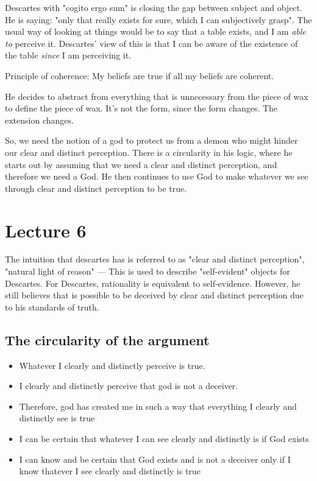 \documentclass[11pt]{book}
\begin{document}
Descartes with "cogito ergo sum" is closing the gap between subject and object.
He is saying: "only that really exists for sure, which I can subjectively
grasp". The usual way of looking at things would be to say that a table exists,
and I am \textit{able to} perceive it. Descartes' view of this is that I can be
aware of the existence of the table \textit{since} I am perceiving it.

Principle of coherence: My beliefs are true if all my beliefs are coherent.

He decides to abstract from everything that is unnecessary from the piece of
wax to define the piece of wax. It's not the form, since the form changes. The
extension changes.


So, we need the notion of a god to protect us from a demon who might hinder our
clear and distinct perception. There is a circularity in his logic, where he
starts out by assuming that we need a clear and distinct perception, and
therefore we need a God. He then continues to use God to make whatever we see
through clear and distinct perception to be true.

\section{Lecture 6}

The intuition that descartes has is referred to as "clear and distinct perception",
"natural light of reason" --- This is used to describe "self-evident" objects
for Descartes. For Descartes, rationality is equivalent to self-evidence.
However, he still believes that is possible to be deceived by clear
and distinct perception due to his standards of truth.

\subsection{The circularity of the argument}

\begin{itemize}
    \item Whatever I clearly and distinctly perceive is true.
    \item I clearly and distinctly perceive that god is not a deceiver.
    \item Therefore, god has created me in such a way that everything I clearly and distinctly see is true
\end{itemize}

\begin{itemize}
    \item I can be certain that whatever I can see clearly and distinctly is if
        God exists
    \item I can know and be certain that God exists and is not a deceiver only
        if I know thatever I see clearly and distinctly is true
\end{itemize}
\end{document}
